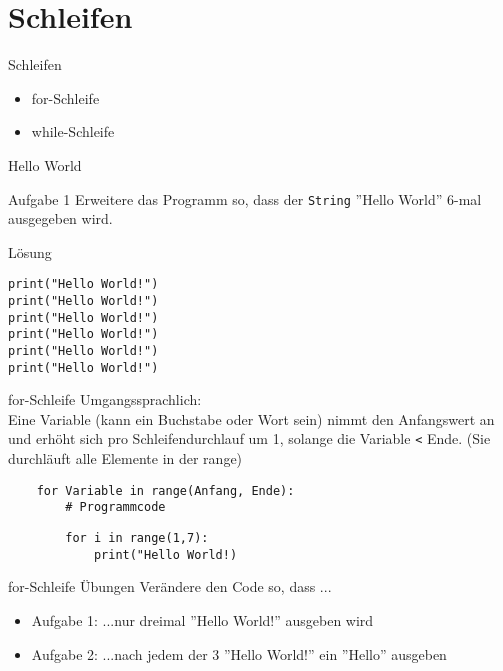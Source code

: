 \section{Schleifen}

\begin{frame}{Schleifen}
\begin{itemize}
	\item for-Schleife
	\item while-Schleife
\end{itemize}
\end{frame}


\begin{frame}[fragile]{Hello World}
\begin{block}{Aufgabe 1}
	Erweitere das Programm so, dass  der \texttt{String} ''Hello World''
	6-mal ausgegeben wird.
\end{block}
\pause{}
\begin{exampleblock}{Lösung}
	\begin{lstlisting}
print("Hello World!")
print("Hello World!")
print("Hello World!")
print("Hello World!")
print("Hello World!")
print("Hello World!")
	\end{lstlisting}
\end{exampleblock}
\end{frame}


\begin{frame}[fragile]{for-Schleife}
	Umgangssprachlich: \\
	Eine Variable (kann ein Buchstabe oder Wort sein) nimmt den Anfangswert an und erhöht sich pro Schleifendurchlauf um 1, solange die Variable \texttt{<} Ende. (Sie durchläuft alle Elemente in der range)
	
	\begin{lstlisting}
	for Variable in range(Anfang, Ende):
		# Programmcode
	\end{lstlisting}
	
	\begin{lstlisting}
		for i in range(1,7):
			print("Hello World!)
	\end{lstlisting}	
\end{frame}

\begin{frame}[fragile]{for-Schleife Übungen}
Verändere den Code so, dass ...
\begin{itemize}
\item Aufgabe 1: ...nur dreimal ''Hello World!'' ausgeben wird\\
\item Aufgabe 2: ...nach jedem der 3 ''Hello World!'' ein ''Hello'' ausgeben
\end{itemize}
\end{frame}


